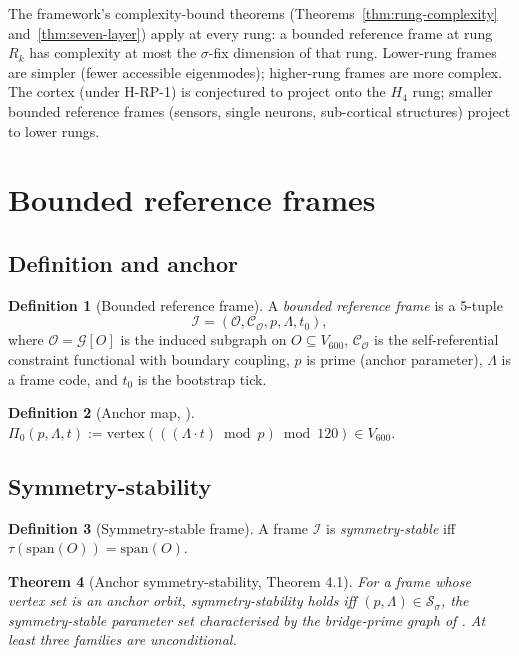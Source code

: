 \documentclass[11pt]{article}
\theoremstyle{plain}
\newtheorem{theorem}{Theorem}[section]
\theoremstyle{definition}
\newtheorem{definition}[theorem]{Definition}
\theoremstyle{remark}
\newcommand{\Ical}{\mathcal{I}}
\newcommand{\Ocal}{\mathcal{O}}
\newcommand{\Ccal}{\mathcal{C}}
\begin{document}
The framework's complexity-bound theorems (Theorems~\ref{thm:rung-complexity} and~\ref{thm:seven-layer}) apply at every rung: a bounded reference frame at rung $R_k$ has complexity at most the $\sigma$-fix dimension of that rung. Lower-rung frames are simpler (fewer accessible eigenmodes); higher-rung frames are more complex. The cortex (under H-RP-1) is conjectured to project onto the $H_4$ rung; smaller bounded reference frames (sensors, single neurons, sub-cortical structures) project to lower rungs.

\section{Bounded reference frames}\label{sec:frames}

\subsection{Definition and anchor}

\begin{definition}[Bounded reference frame]\label{def:frame}
A \emph{bounded reference frame} is a 5-tuple
\[
  \Ical = (\Ocal, \Ccal_\Ocal, p, \Lambda, t_0),
\]
where $\Ocal = \mathcal{G}[O]$ is the induced subgraph on $O \subseteq V_{600}$, $\Ccal_\Ocal$ is the self-referential constraint functional with boundary coupling, $p$ is prime (anchor parameter), $\Lambda$ is a frame code, and $t_0$ is the bootstrap tick.
\end{definition}

\begin{definition}[Anchor map, \citet{SmartSoulPrime}]\label{def:anchor}
$\Pi_0(p, \Lambda, t) := \mathrm{vertex}( ((\Lambda \cdot t) \bmod p) \bmod 120 ) \in V_{600}.$
\end{definition}

\subsection{Symmetry-stability}

\begin{definition}[Symmetry-stable frame]\label{def:sigma-stable}
A frame $\Ical$ is \emph{symmetry-stable} iff $\tau(\mathrm{span}(O)) = \mathrm{span}(O)$.
\end{definition}

\begin{theorem}[Anchor symmetry-stability, \citet{PerObserverZeroLine} Theorem 4.1]\label{thm:anchor-sigma}
For a frame whose vertex set is an anchor orbit, symmetry-stability holds iff $(p, \Lambda) \in \mathcal{S}_\sigma$, the symmetry-stable parameter set characterised by the bridge-prime graph of \citet{SmartSoulPrime}. At least three families are unconditional.
\end{theorem}
\end{document}
